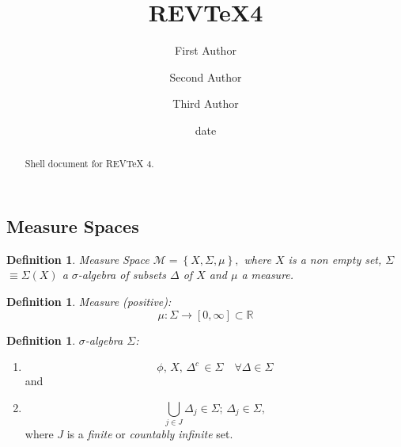 \documentclass[aps,preprint]{revtex4}%
\newtheorem{definition}[theorem]{Definition}
\begin{document}
\title[Short title for running header]{REV\TeX4}
\author{First Author}
\author{Second Author}
\author{Third Author}

\begin{abstract}
Shell document for REV\TeX{} 4.

\end{abstract}
\date[Date text]{date}




\maketitle
\tableofcontents


\subsection{Measure Spaces}

\begin{definition}
Measure Space $\mathcal{M}=\left\{  X,\Sigma,\mu\right\}  ,$ where $X$ is a
non empty set, $\Sigma$ $\equiv\Sigma\left(  X\right)  $ a $\sigma$-algebra of
subsets $\Delta$ of $X$ and $\mu$ a measure.
\end{definition}

\begin{definition}
Measure (positive):%
\begin{equation}
\mu:\Sigma\rightarrow\left[  0,\infty\right]  \subset\mathbb{R}%
\end{equation}

\end{definition}

\begin{definition}
$\sigma$-algebra $\Sigma$:
\end{definition}

\begin{enumerate}
\item
\begin{equation}
\phi,\,X,\,\Delta^{c}\,\in\Sigma\quad\forall\Delta\in\Sigma
\end{equation}
and

\item
\begin{equation}%
{\textstyle\bigcup\limits_{j\in J}}
\Delta_{j}\in\Sigma;\,\Delta_{j}\in\Sigma,
\end{equation}
where $J$ is a \emph{finite} or \emph{countably infinite} set.
\end{enumerate}
\end{document}
